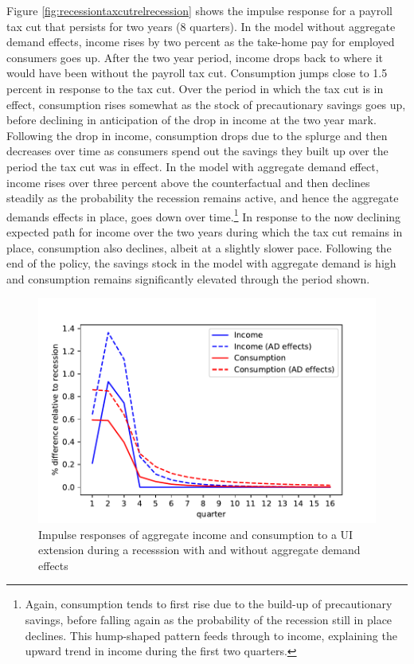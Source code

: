 \documentclass[../HAFiscal]{subfiles}
\begin{document}
Figure \ref{fig:recessiontaxcutrelrecession} shows the impulse response for a payroll tax cut that persists for two years (8 quarters). In the model without aggregate demand effects, income rises by two percent as the take-home pay for employed consumers goes up. After the two year period, income drops back to where it would have been without the payroll tax cut. Consumption jumps close to 1.5 percent in response to the tax cut. Over the period in which the tax cut is in effect, consumption rises somewhat as the stock of precautionary savings goes up, before declining in anticipation of the drop in income at the two year mark. Following the drop in income, consumption drops due to the splurge and then decreases over time as consumers spend out the savings they built up over the period the tax cut was in effect. In the model with aggregate demand effect, income rises over three percent above the counterfactual and then declines steadily as the probability the recession remains active, and hence the aggregate demands effects in place, goes down over time.\footnote{Again, consumption tends to first rise due to the build-up of precautionary savings, before falling again as the probability of the recession still in place declines. This hump-shaped pattern feeds through to income, explaining the upward trend in income during the first two quarters.} In response to the now declining expected path for income over the two years during which the tax cut remains in place, consumption also declines, albeit at a slightly slower pace. Following the end of the policy, the savings stock in the model with aggregate demand is high and consumption remains significantly elevated through the period shown.

\begin{figure}
	\centering
	\includegraphics[width=0.8\linewidth]{Code/HA-Models/FromPandemicCode/Figures/recession_UI_relrecession}
	\caption{Impulse responses of aggregate income and consumption to a UI extension during a recesssion with and without aggregate demand effects}
	\label{fig:recessionuirelrecession}
\end{figure}
\end{document}
